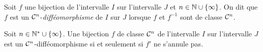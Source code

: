 \documentclass{magnolia}
\begin{document}

\begin{definition}[utile=-3]
Soit $f$ une bijection de l'intervalle $I$ sur l'intervalle $J$ et
$n\in\mathbb{N}\cup\left\{\infty\right\}$. On dit que $f$ est un $\mathcal{C}^{n}$-\emph{difféomorphisme}
de $I$ sur $J$ lorsque $f$ et $f^{-1}$ sont de classe $\mathcal{C}^{n}$.
\end{definition}


\begin{proposition}[utile=-3]
Soit $n\in{\mathbb{N}^*}\cup\left\{\infty\right\}$. Une bijection $f$ de classe $\mathcal{C}^{n}$ de
l'intervalle $I$ sur l'intervalle $J$ est un $\mathcal{C}^{n}$-difféomorphisme si
et seulement si $f'$ ne s'annule pas.
\end{proposition}
\end{document}
